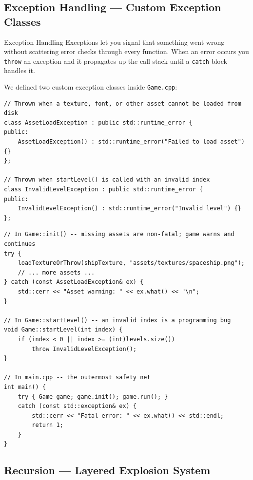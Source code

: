 \documentclass[11pt]{article}
\begin{document}
\subsection{Exception Handling --- Custom Exception Classes}

\begin{conceptbox}{Exception Handling}
Exceptions let you signal that something went wrong without scattering error
checks through every function. When an error occurs you \texttt{throw} an
exception and it propagates up the call stack until a \texttt{catch} block
handles it.
\end{conceptbox}

We defined two custom exception classes inside \texttt{Game.cpp}:

\begin{lstlisting}[caption={Custom exception classes (Game.cpp)}]
// Thrown when a texture, font, or other asset cannot be loaded from disk
class AssetLoadException : public std::runtime_error {
public:
    AssetLoadException() : std::runtime_error("Failed to load asset") {}
};

// Thrown when startLevel() is called with an invalid index
class InvalidLevelException : public std::runtime_error {
public:
    InvalidLevelException() : std::runtime_error("Invalid level") {}
};
\end{lstlisting}

\begin{lstlisting}[caption={Throwing and catching exceptions (Game.cpp)}]
// In Game::init() -- missing assets are non-fatal; game warns and continues
try {
    loadTextureOrThrow(shipTexture, "assets/textures/spaceship.png");
    // ... more assets ...
} catch (const AssetLoadException& ex) {
    std::cerr << "Asset warning: " << ex.what() << "\n";
}

// In Game::startLevel() -- an invalid index is a programming bug
void Game::startLevel(int index) {
    if (index < 0 || index >= (int)levels.size())
        throw InvalidLevelException();
}

// In main.cpp -- the outermost safety net
int main() {
    try { Game game; game.init(); game.run(); }
    catch (const std::exception& ex) {
        std::cerr << "Fatal error: " << ex.what() << std::endl;
        return 1;
    }
}
\end{lstlisting}

\subsection{Recursion --- Layered Explosion System}
\end{document}
